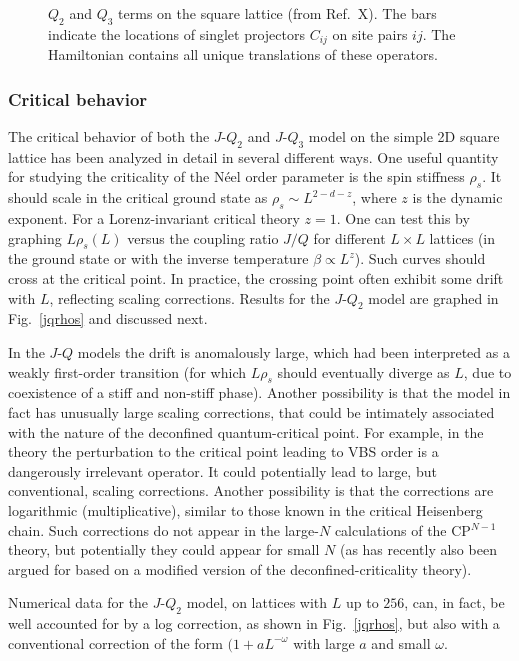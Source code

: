 \documentclass[range]{ar2e}
\begin{document}
\begin{figure}
\centerline{}
\caption{$Q_2$ and $Q_3$ terms on the square lattice (from Ref.~X). The bars indicate the locations of singlet projectors 
$C_{ij}$ on site pairs $ij$. The Hamiltonian contains all unique translations of these operators.}
\label{qterms}
\end{figure}

\subsubsection{Critical behavior}

The critical behavior of both the $J$-$Q_2$ and $J$-$Q_3$ model on the simple 2D square lattice has been analyzed in detail in several different ways. 
One useful quantity for studying the criticality of the N\'eel order parameter is the spin stiffness $\rho_s$. It should scale in the critical ground state 
as $\rho_s \sim L^{2-d-z}$, where $z$ is the dynamic exponent. For a Lorenz-invariant critical theory $z=1$. One can test this by graphing $L\rho_s(L)$ versus 
the coupling ratio $J/Q$ for different $L\times L$ lattices (in the ground state or with the inverse temperature $\beta \propto L^z$). Such curves should 
cross at the critical point. In practice, the crossing point often exhibit some drift with $L$, reflecting scaling corrections. Results for the $J$-$Q_2$ 
model are graphed in Fig.~\ref{jqrhos} and discussed next.

In the $J$-$Q$ models the drift is anomalously large, which had been interpreted as a weakly first-order transition (for which $L\rho_s$
should eventually diverge as $L$, due to coexistence of a stiff and non-stiff phase). Another possibility is that the model in fact has unusually
large scaling corrections, that could be intimately associated with the nature of the deconfined quantum-critical point. For example, in the
theory the perturbation to the critical point leading to VBS order is a dangerously irrelevant operator. It could potentially lead to large, but
conventional, scaling corrections. Another possibility is that the corrections are logarithmic (multiplicative), similar to those known in the
critical Heisenberg chain. Such corrections do not appear in the large-$N$ calculations of the CP$^{N-1}$ theory, but potentially they could
appear for small $N$ (as has recently also been argued for based on a modified version of the deconfined-criticality theory).

Numerical data for the $J$-$Q_2$ model, on lattices with $L$ up to $256$, can, in fact, be well accounted for by a log correction, as shown in 
Fig.~\ref{jqrhos}, but also with a conventional correction of the form $(1+aL^{-\omega}$ with large $a$ and small $\omega$.
\end{document}
